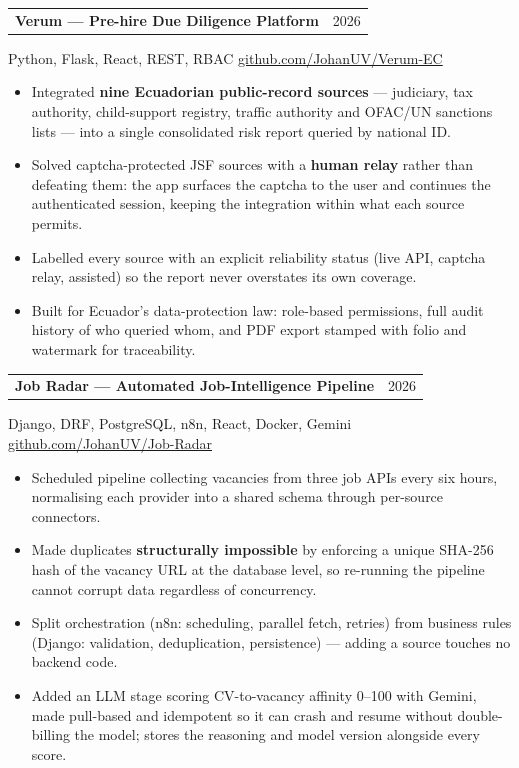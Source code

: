 \documentclass[10.5pt,a4paper]{article}
\makeatletter
\newcommand{\entry}[2]{%
  \begin{tabularx}{\linewidth}{@{}Xr@{}}
    \textbf{#1} & {\small\color{soft}#2}
  \end{tabularx}%
  \vspace{0.15em}
}
\newcommand{\subentry}[1]{{\small\color{muted}#1}\vspace{0.25em}}
\newenvironment{points}
  {\begin{itemize}[leftmargin=1.1em, itemsep=0.18em, topsep=0.25em, parsep=0pt, label=\textcolor{soft}{\footnotesize\textbullet}]}
  {\end{itemize}}
\makeatother
\begin{document}
\entry{Verum --- Pre-hire Due Diligence Platform}{2026}
\subentry{Python, Flask, React, REST, RBAC \textbullet{} \href{https://github.com/JohanUV/Verum-EC}{github.com/JohanUV/Verum-EC}}
\begin{points}
  \item Integrated \textbf{nine Ecuadorian public-record sources} --- judiciary, tax authority,
        child-support registry, traffic authority and OFAC/UN sanctions lists --- into a single
        consolidated risk report queried by national ID.
  \item Solved captcha-protected JSF sources with a \textbf{human relay} rather than defeating
        them: the app surfaces the captcha to the user and continues the authenticated session,
        keeping the integration within what each source permits.
  \item Labelled every source with an explicit reliability status (live API, captcha relay,
        assisted) so the report never overstates its own coverage.
  \item Built for Ecuador's data-protection law: role-based permissions, full audit history of
        who queried whom, and PDF export stamped with folio and watermark for traceability.
\end{points}

\entry{Job Radar --- Automated Job-Intelligence Pipeline}{2026}
\subentry{Django, DRF, PostgreSQL, n8n, React, Docker, Gemini \textbullet{} \href{https://github.com/JohanUV/Job-Radar}{github.com/JohanUV/Job-Radar}}
\begin{points}
  \item Scheduled pipeline collecting vacancies from three job APIs every six hours,
        normalising each provider into a shared schema through per-source connectors.
  \item Made duplicates \textbf{structurally impossible} by enforcing a unique SHA-256 hash of
        the vacancy URL at the database level, so re-running the pipeline cannot corrupt data
        regardless of concurrency.
  \item Split orchestration (n8n: scheduling, parallel fetch, retries) from business rules
        (Django: validation, deduplication, persistence) --- adding a source touches no backend code.
  \item Added an LLM stage scoring CV-to-vacancy affinity 0--100 with Gemini, made pull-based
        and idempotent so it can crash and resume without double-billing the model; stores the
        reasoning and model version alongside every score.
\end{points}
\end{document}
